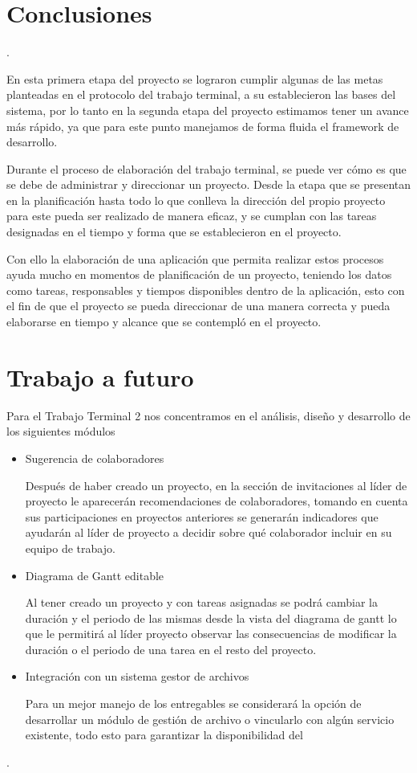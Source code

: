 \section{Conclusiones  }.    

En esta primera etapa del proyecto se lograron cumplir algunas de las metas planteadas en el protocolo del trabajo terminal, a su establecieron las bases del sistema, por lo tanto en la segunda etapa del proyecto estimamos tener un avance más rápido, ya que para este punto manejamos de forma fluida el framework de desarrollo. 



Durante el proceso de elaboración del trabajo terminal, se puede ver cómo es que se debe de administrar y direccionar un proyecto. Desde la etapa que se presentan en la planificación hasta todo lo que conlleva la dirección del propio proyecto para este pueda ser realizado de manera eficaz, y se cumplan con las tareas designadas en el tiempo y forma que se establecieron en el proyecto. 

Con ello la elaboración de una aplicación que permita realizar estos procesos ayuda mucho en momentos de planificación de un proyecto, teniendo los datos como tareas, responsables y tiempos disponibles dentro de la aplicación, esto con el fin de que el proyecto se pueda direccionar de una manera correcta y pueda elaborarse en tiempo y alcance que se contempló en el proyecto. 
\section{Trabajo a futuro }
Para el Trabajo Terminal 2 nos concentramos en el análisis, diseño y desarrollo de los siguientes módulos 
\begin{itemize}
\item Sugerencia de colaboradores 

Después de haber creado un proyecto, en la sección de invitaciones al líder de proyecto le aparecerán recomendaciones de colaboradores, tomando en cuenta sus participaciones en proyectos anteriores se generarán indicadores que ayudarán al líder de proyecto a decidir sobre qué colaborador incluir en su equipo de trabajo. 

\item Diagrama de Gantt editable 

Al tener creado un proyecto y con tareas asignadas se podrá cambiar la duración y el periodo de las mismas desde la vista del diagrama de gantt lo que le permitirá al líder proyecto observar las consecuencias de modificar la duración o el periodo de una tarea en el resto del proyecto.  

\item Integración con un sistema gestor de archivos 

Para un mejor manejo de los entregables se considerará la opción de desarrollar un módulo de gestión de archivo o vincularlo con algún servicio existente, todo esto para garantizar la disponibilidad del  
\end{itemize}.    


